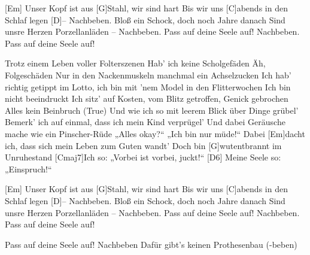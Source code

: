 \begin{guitar}
	\begin{highlightbar}
		[Em] Unser Kopf ist aus [G]Stahl, wir sind hart
		Bis wir uns [C]abends in den Schlaf legen [D]{–} Nachbeben.
		Bloß ein Schock, doch noch Jahre danach
		Sind unsre Herzen Porzellanläden – Nachbeben.
		Pass auf deine Seele auf! Nachbeben.
		Pass auf deine Seele auf!
	\end{highlightbar}
	
	\songsection{Strophe 3}
	Trotz einem Leben voller Folterszenen
	Hab' ich keine Scholgefäden
	Äh, Folgeschäden
	Nur in den Nackenmuskeln manchmal ein Achselzucken
	Ich hab' richtig getippt im Lotto, ich bin mit 'nem Model in den Flitterwochen
	Ich bin nicht beeindruckt
	Ich sitz' auf Kosten, vom Blitz getroffen, Genick gebrochen
	Alles kein Beinbruch (True)
	Und wie ich so mit leerem Blick über Dinge grübel'
	Bemerk' ich auf einmal, dass ich mein Kind verprügel'
	Und dabei Geräusche mache wie ein Pinscher-Rüde
	„Alles okay?“ „Ich bin nur müde!“
	Dabei [Em]dacht ich, dass sich mein Leben zum Guten wandt'
	Doch bin [G]wutentbrannt im Unruhestand
	[Cmaj7]Ich so: „Vorbei ist vorbei, juckt!“
	[D6] Meine Seele so: „Einspruch!“
	
	\begin{highlightbar}
		\songsection{Refrain}
		[Em] Unser Kopf ist aus [G]Stahl, wir sind hart
		Bis wir uns [C]abends in den Schlaf legen [D]{–} Nachbeben.
		Bloß ein Schock, doch noch Jahre danach
		Sind unsre Herzen Porzellanläden – Nachbeben.
		Pass auf deine Seele auf! Nachbeben.
		Pass auf deine Seele auf!
		
		Pass auf deine Seele auf! Nachbeben
		Dafür gibt's keinen Prothesenbau (-beben)
	\end{highlightbar}
\end{guitar}